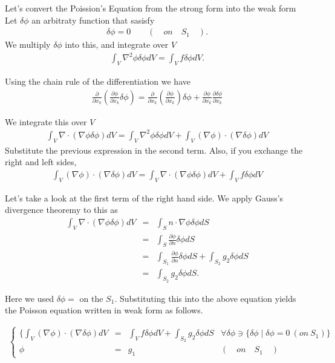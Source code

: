 Let's convert the Poission's Equation from the strong form into the weak form
%
Let $\delta\phi$ an arbitraty function that sasisfy
%
\begin{eqnarray}
\delta\phi = 0 \qquad ( \quad on \quad S_1 \quad ).
\end{eqnarray}
%
We multiply $\delta\phi$ into this, and integrate over $V$
%
\begin{eqnarray}
\int_V \nabla^2 \phi \delta \phi dV=\int_V f \delta\phi dV.
\end{eqnarray}


Using the chain rule of the differentiation we have
%
\begin{eqnarray}
\frac{\partial}{\partial x_k}\left(\frac{\partial\phi}{\partial x_k}\delta\phi\right)
=  \frac{\partial}{\partial x_k}\left(\frac{\partial\phi}{\partial x_k}\right)\delta\phi
+ \frac{\partial\phi}{\partial x_k}\frac{\partial\delta\phi}{\partial x_k}
\end{eqnarray}


We integrate this over $V$
%
\begin{eqnarray}
\int_V \nabla \cdot ( \nabla \phi \delta \phi ) dV  =  \int_V \nabla^2 \phi \delta \phi dV  +  \int_V (\nabla \phi) \cdot (\nabla \delta \phi) dV
\end{eqnarray}
%
Substitute the previous expression in the second term. Also, if you exchange the right and left sides,
%
\begin{eqnarray}
\int_V (\nabla \phi) \cdot (\nabla \delta \phi) dV  = \int_V \nabla \cdot ( \nabla \phi \delta \phi ) dV  + \int_V f \delta\phi dV
\end{eqnarray}


Let's take a look at the first term of the right hand side.
%
We apply Gauss's divergence theoremy to this as
%
\begin{eqnarray}
\int_V \nabla \cdot ( \nabla \phi \delta \phi ) dV
&=&  \int_S n \cdot \nabla \phi \delta \phi dS  \\
&=&  \int_S \frac{ \partial \phi }{ \partial n } \delta \phi dS  \\
&=&  \int_{S_1} \frac{ \partial \phi }{ \partial n } \delta \phi dS  +  \int_{S_2} g_2 \delta \phi dS\\
&=&  \int_{S_2} g_2 \delta \phi dS.
\end{eqnarray}

Here we used $\delta \phi=$ on the $S_1$.
%
Substituting this into the above equation yields the Poisson equation written in weak form as follows.

\begin{tcolorbox}[title=Poission equation in Weak Form]
\begin{eqnarray}
\label{eqn:weak_form_poisson}
\left\{ \begin{array}{rlll}
\{\int_V (\nabla \phi) \cdot (\nabla \delta \phi) dV &=& \int_V f \delta\phi dV + \int_{S_2} g_2 \delta \phi dS
& \forall\delta\phi\ni \{ \delta\phi \mid \delta\phi=0 ~(on~S_1) \} \\
\phi &=& g_1
& (\quad on \quad S_1 \quad)
\end{array}\right.
\end{eqnarray}
\end{tcolorbox}




